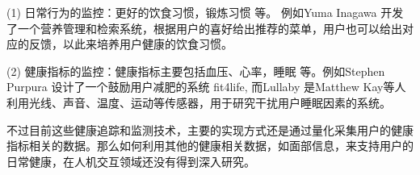(1) 日常行为的监控：更好的饮食习惯，锻炼习惯\cite{purpura2011fit4life} \cite{Inagawa2013A} \cite{bravata2007using} \cite{cordeiro2015barriers} \cite{lin2006fish} \cite{miller2014stepstream}等。 例如Yuma Inagawa  \cite{Inagawa2013A} 开发了一个营养管理和检索系统，根据用户的喜好给出推荐的菜单，用户也可以给出对应的反馈，以此来培养用户健康的饮食习惯。


(2) 健康指标的监控：健康指标主要包括血压、心率，睡眠\cite{kay2012lullaby} \cite{gronvall2013beyond} \cite{logan2007mobile} \cite{walters2010a}等。例如Stephen Purpura \cite{purpura2011fit4life} 设计了一个鼓励用户减肥的系统 fit4life,  而Lullaby  \cite{kay2012lullaby} 是Matthew Kay等人利用光线、声音、温度、运动等传感器，用于研究干扰用户睡眠因素的系统。 


不过目前这些健康追踪和监测技术，主要的实现方式还是通过量化采集用户的健康指标相关的数据。那么如何利用其他的健康相关数据，如面部信息，来支持用户的日常健康，在人机交互领域还没有得到深入研究。




 
